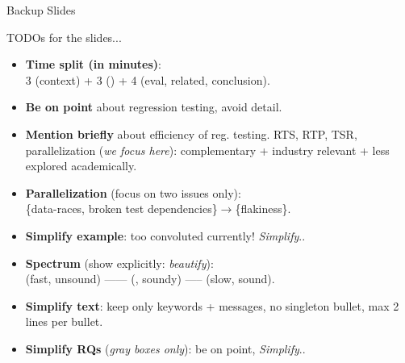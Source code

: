 \documentclass{beamer}
\begin{document}


\renewcommand{\disp}{}

\appendix
\backupbegin

\begin{frame}
	\begin{center}
		{\huge Backup Slides}
	\end{center}
\end{frame}

\begin{frame}{TODOs for the slides...}
	\begin{itemize}
		\item[]{\textbf{Time split (in minutes)}:\\3 (context) + 3 (\tname{}) + 4 (eval, related, conclusion).}
		\vfill
		\item{\textbf{Be on point} about regression testing, avoid detail.}
		\item{\textbf{Mention briefly} about efficiency of reg. testing. RTS, RTP, TSR, parallelization (\textit{we focus here}): complementary + industry relevant + less explored academically.}
		\item{\textbf{Parallelization} (focus on two issues only):\\\{data-races, broken test dependencies\}$\rightarrow$\{flakiness\}.}
		\item{\textbf{Simplify example}: too convoluted currently! \textit{Simplify}..}
		\item{\textbf{Spectrum} (show explicitly: \textit{beautify}):\\(fast, unsound) ------ (\tname{}, soundy) ----- (slow, sound).}
		\item{\textbf{Simplify text}: keep only keywords + messages, no singleton bullet, max 2 lines per bullet.}
		\item{\textbf{Simplify RQs} (\textit{gray boxes only}): be on point, \textit{Simplify}..}
	\end{itemize}
\end{frame}
\end{document}
